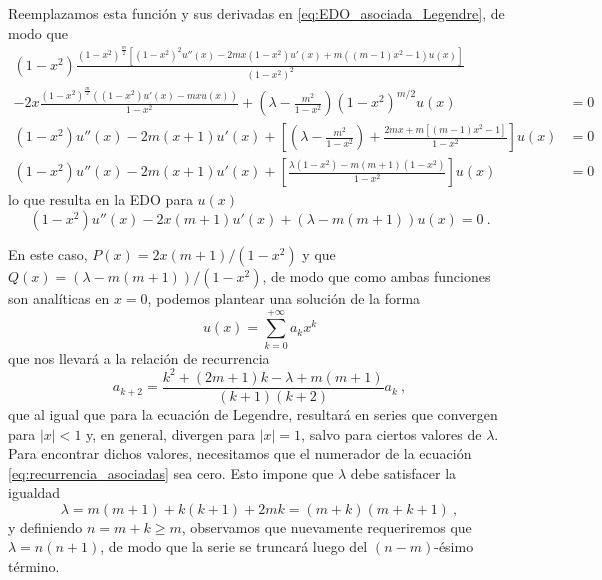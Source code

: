 Reemplazamos esta función y sus derivadas en \eqref{eq:EDO_asociada_Legendre}, de modo que
\begin{align*}
    (1-x^2)\frac{\left(1 - x^{2}\right)^{\frac{m}{2}} \left[(1-x^2)^2 u'' \left(x\right) - 2mx (1 - x^2) u'(x) + m\left((m - 1) x^{2} - 1\right) u\left(x\right)\right]}{(1- x^2)^2} & \\
    - 2x \frac{\left(1 - x^{2}\right)^{\frac{m}{2}} \left((1 - x^2) u'\left(x\right) - mx u\left(x\right)\right)}{1 - x^2} + \left(\lambda - \frac{m^2}{1-x^2}\right) (1-x^2)^{m/2} u(x) & = 0 \\
    (1-x^2) u''(x)  - 2m (x + 1) u'(x) + \left[ \left( \lambda - \frac{m^2}{1-x^2} \right) + \frac{2mx + m[(m-1)x^2 - 1]}{1-x^2} \right]u(x) & = 0 \\
    (1-x^2) u''(x)  - 2m (x + 1) u'(x) + \left[ \frac{\lambda(1-x^2) - m(m+1)(1-x^2)}{1-x^2} \right]u(x) & = 0 \,
\end{align*}
%
%
%
%
lo que resulta en la EDO para $u(x)$
\begin{equation}
    (1-x^2)u''(x) - 2x(m+1)u'(x) + (\lambda - m(m+1))u(x) = 0 \ .
\end{equation}

En este caso, $P(x) = 2x(m+1)/(1-x^2)$ y que $Q(x) = (\lambda - m(m+1))/(1-x^2)$, de modo que como ambas funciones son analíticas en $x=0$, podemos plantear una solución de la forma
\begin{equation}
    u(x) = \sum_{k=0}^{+\infty} a_k x^k 
\end{equation} 
que nos llevará a la relación de recurrencia
\begin{equation}\label{eq:recurrencia_asociadas}
    a_{k+2} = \frac{k^2 + (2m+1)k - \lambda + m(m+1)}{(k+1)(k+2)} a_k \ ,
\end{equation}
que al igual que para la ecuación de Legendre, resultará en series que convergen para $|x|<1$ y, en general, divergen para $|x|=1$, salvo para ciertos valores de $\lambda$. Para encontrar dichos valores, necesitamos que el numerador de la ecuación \eqref{eq:recurrencia_asociadas} sea cero. Esto impone que $\lambda$ debe satisfacer la igualdad
\begin{equation}
    \lambda = m(m+1) + k(k+1) + 2mk = (m+k)(m+k+1) \ ,
\end{equation}
y definiendo $n = m+k \geq m$, observamos que nuevamente requeriremos que $\lambda = n(n+1)$, de modo que la serie se truncará luego del $(n-m)$-ésimo término.

